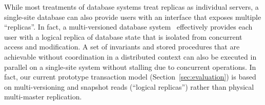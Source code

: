 While most treatments
of database systems treat replicas as individual servers, a
single-site database can also provide users with an interface that
exposes multiple ``replicas''. In fact, a multi-versioned database
system~\cite{bernstein-book} effectively provides each user with a
logical replica of database state that is isolated from concurrent
access and modification. A set of invariants and stored procedures
that are achievable without coordination in a distributed context can
also be executed in parallel on a single-site system without stalling
due to concurrent operations.  In fact, our current prototype
transaction model (Section~\ref{sec:evaluation}) is based on
multi-versioning and snapshot reads (``logical replicas'') rather than
physical multi-master replication.
